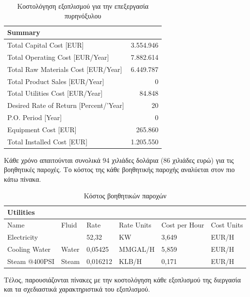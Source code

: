 \documentclass[11pt]{article}
\begin{document}
\begin{table}[htbp]
\caption{Κοστολόγηση εξοπλισμού για την επεξεργασία πυρηνόξυλου}
\centering
\begin{tabular}{lr}
Summary & \\
\hline
Total Capital Cost [EUR] & 3.554.946\\
Total Operating Cost [EUR/Year] & 7.882.614\\
Total Raw Materials Cost [EUR/Year] & 6.449.787\\
Total Product Sales [EUR/Year] & 0\\
Total Utilities Cost [EUR/Year] & 84.848\\
Desired Rate of Return [Percent/'Year] & 20\\
P.O. Period [Year] & 0\\
Equipment Cost [EUR] & 265.860\\
Total Installed Cost [EUR] & 1.205.550\\
\end{tabular}
\end{table}

Κάθε χρόνο απαιτούνται συνολικά 94 χιλιάδες δολάρια (86 χιλιάδες ευρώ)
για τις βοηθητικές παροχές. Το κόστος της κάθε βοηθητικής παροχής
αναλύεται στον πιο κάτω πίνακα.

\begin{table}[htbp]
\caption{Κόστος βοηθητικών παροχών}
\centering
\begin{tabular}{llllll}
Utilities &  &  &  &  & \\
\hline
Name & Fluid & Rate & Rate Units & Cost per Hour & Cost Units\\
Electricity &   & 52,32 & KW & 3,649 & EUR/H\\
Cooling Water & Water & 0,05425 & MMGAL/H & 5,859 & EUR/H\\
Steam @400PSI & Steam & 0,016212 & KLB/H & 0,171 & EUR/H\\
\end{tabular}
\end{table}

Τέλος, παρουσιάζονται πίνακες με την κοστολόγηση κάθε εξοπλισμού της
διεργασία και τα σχεδιαστικά χαρακτηριστικά του εξοπλισμού.
\end{document}
